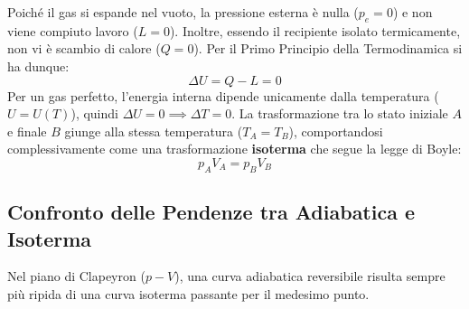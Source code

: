 Poiché il gas si espande nel vuoto, la pressione esterna è nulla ($p_e = 0$) e non viene compiuto lavoro ($L = 0$). Inoltre, essendo il recipiente isolato termicamente, non vi è scambio di calore ($Q = 0$). Per il Primo Principio della Termodinamica si ha dunque:
\begin{equation}
    \Delta U = Q - L = 0
\end{equation}
Per un gas perfetto, l'energia interna dipende unicamente dalla temperatura ($U = U(T)$), quindi $\Delta U = 0 \implies \Delta T = 0$. La trasformazione tra lo stato iniziale $A$ e finale $B$ giunge alla stessa temperatura ($T_A = T_B$), comportandosi complessivamente come una trasformazione \textbf{isoterma} che segue la legge di Boyle:
\begin{equation}
    p_A V_A = p_B V_B
\end{equation}

\subsection{Confronto delle Pendenze tra Adiabatica e Isoterma}
Nel piano di Clapeyron ($p-V$), una curva adiabatica reversibile risulta sempre più ripida di una curva isoterma passante per il medesimo punto.

